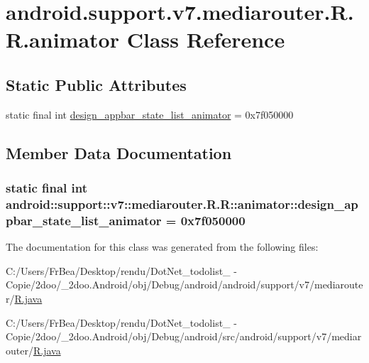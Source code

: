 \hypertarget{classandroid_1_1support_1_1v7_1_1mediarouter_1_1_r_1_1animator}{
\section{android.support.v7.mediarouter.R.R.animator Class Reference}
\label{classandroid_1_1support_1_1v7_1_1mediarouter_1_1_r_1_1animator}
}
\subsection*{Static Public Attributes}
\begin{CompactItemize}
\item 
static final int \hyperlink{classandroid_1_1support_1_1v7_1_1mediarouter_1_1_r_1_1animator_f494079aa6827cda4dd1e78dbd54837d}{design\_\-appbar\_\-state\_\-list\_\-animator} = 0x7f050000
\end{CompactItemize}


\subsection{Member Data Documentation}
\hypertarget{classandroid_1_1support_1_1v7_1_1mediarouter_1_1_r_1_1animator_f494079aa6827cda4dd1e78dbd54837d}{
\subsubsection[{design\_\-appbar\_\-state\_\-list\_\-animator}]{\setlength{\rightskip}{0pt plus 5cm}static final int android::support::v7::mediarouter.R.R::animator::design\_\-appbar\_\-state\_\-list\_\-animator = 0x7f050000}}
\label{classandroid_1_1support_1_1v7_1_1mediarouter_1_1_r_1_1animator_f494079aa6827cda4dd1e78dbd54837d}




The documentation for this class was generated from the following files:\begin{CompactItemize}
\item 
C:/Users/FrBea/Desktop/rendu/DotNet\_\-todolist\_ - Copie/2doo/\_\-2doo.Android/obj/Debug/android/android/support/v7/mediarouter/\hyperlink{android_2support_2v7_2mediarouter_2_r_8java}{R.java}\item 
C:/Users/FrBea/Desktop/rendu/DotNet\_\-todolist\_ - Copie/2doo/\_\-2doo.Android/obj/Debug/android/src/android/support/v7/mediarouter/\hyperlink{src_2android_2support_2v7_2mediarouter_2_r_8java}{R.java}\end{CompactItemize}
